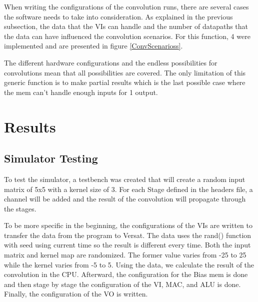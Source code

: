 \documentclass[conference]{IEEEtran}
\begin{document}
When writing the configurations of the convolution runs, there are several cases the software needs to take into consideration.
As explained in the previous subsection, the data that the VIs can handle and the number of datapaths that the data can have influenced
the convolution scenarios. For this function, 4 were implemented and are presented in figure \ref{ConvScenarioss}.


The different hardware configurations and the endless possibilities for convolutions mean that all possibilities are covered. 
The only limitation of this generic function is to make partial results which is the last possible case where the mem can't handle enough inputs for 
1 output.




% 




\section{Results}
\label{chapter:results}

\subsection{Simulator Testing}
\label{section:simtest}

To test the simulator, a testbench was created that will create a random input matrix of 5x5
with a kernel size of 3. For each Stage defined in the headers file, a channel will be added and
the result of the convolution will propagate through the stages.

To be more specific in the beginning, the configurations of the VIs are written to transfer the data
from the program to Versat. The data uses the rand() function with seed using current time
so the result is different every time. Both the input matrix and kernel map are randomized.
The former value varies from -25 to 25 while the kernel varies from -5 to 5. Using the data, 
we calculate the result of the convolution in the CPU. Afterward, the configuration for the Bias mem
is done and then stage by stage the configuration of the VI, MAC, and ALU is done. Finally, the
configuration of the VO is written.
\end{document}
